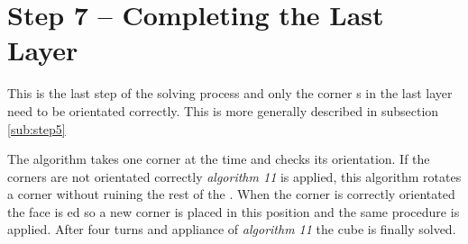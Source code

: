 \section{Step 7 -- Completing the Last Layer}
This is the last step of the solving process and only the corner \cpiece{}s in the last layer need to be orientated correctly. This is more generally described in subsection \ref{sub:step5}

The algorithm takes one corner \cpiece{} at the time and checks its orientation. If the corners are not orientated correctly \textit{algorithm 11} is applied, this algorithm rotates a corner without ruining the rest of the \cube{}. When the corner is correctly orientated the  face is \twist{}ed so a new corner is placed in this position and the same procedure is applied. After four  turns and appliance of \textit{algorithm 11} the cube is finally solved. 



\begin{comment}
In the last layer the corners in the last layer were poisitend correctly but not oreiented. In this step will the coreners be oreinted correctly and as result it will lead to that the \rubiks{} will be solved.

This step is very simple because it there is only four corners to control and either the corner is oriented correctly or is isn't.  

The program vil first control that the front-right-up corner is oriented correctly if not the will use the an algorithm twice and after the program vil control the corner again if the corner is not oriented correctly his time the use teh algorithme and will continue with this until the corner is oriented correctly. 
Then the corner is orented correctly the program will make at up move ("U") and will control the new corner and the program will do this with every corner in the last layer until they are oriented corectly.  

\end{comment}
